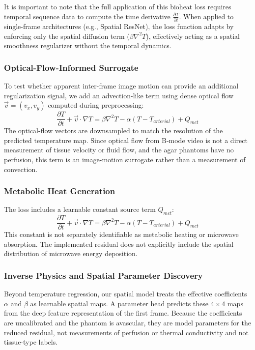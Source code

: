 It is important to note that the full application of this bioheat loss requires temporal sequence data to compute the time derivative $\frac{\partial T}{\partial t}$. When applied to single-frame architectures (e.g., Spatial ResNet), the loss function adapts by enforcing only the spatial diffusion term ($\beta \nabla^2 T$), effectively acting as a spatial smoothness regularizer without the temporal dynamics.

\subsubsection{Optical-Flow-Informed Surrogate}
To test whether apparent inter-frame image motion can provide an additional regularization signal, we add an advection-like term using dense optical flow $\vec{v} = (v_x, v_y)$ computed during preprocessing:
\begin{equation}
    \frac{\partial T}{\partial t} + \vec{v} \cdot \nabla T = \beta \nabla^2 T - \alpha(T - T_{arterial}) + Q_{met}
\end{equation}
The optical-flow vectors are downsampled to match the resolution of the predicted temperature map. Since optical flow from B-mode video is not a direct measurement of tissue velocity or fluid flow, and the agar phantoms have no perfusion, this term is an image-motion surrogate rather than a measurement of convection.

\subsubsection{Metabolic Heat Generation}
The loss includes a learnable constant source term $Q_{met}$:
\begin{equation}
    \frac{\partial T}{\partial t} + \vec{v} \cdot \nabla T = \beta \nabla^2 T - \alpha(T - T_{arterial}) + Q_{met}
\end{equation}
This constant is not separately identifiable as metabolic heating or microwave absorption. The implemented residual does not explicitly include the spatial distribution of microwave energy deposition.

\subsubsection{Inverse Physics and Spatial Parameter Discovery}
Beyond temperature regression, our spatial model treats the effective coefficients $\alpha$ and $\beta$ as learnable spatial maps. A parameter head predicts these $4\times4$ maps from the deep feature representation of the first frame. Because the coefficients are uncalibrated and the phantom is avascular, they are model parameters for the reduced residual, not measurements of perfusion or thermal conductivity and not tissue-type labels.

